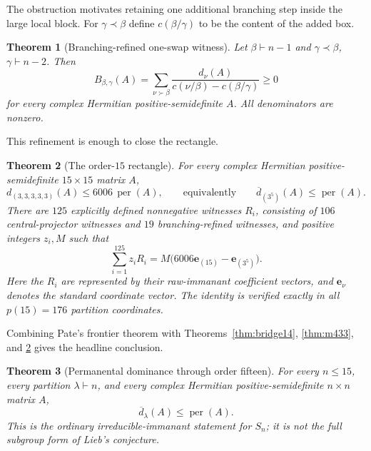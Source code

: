 \documentclass[11pt]{article}
\newtheorem{theorem}{Theorem}[section]
\theoremstyle{definition}
\newcommand{\per}{\operatorname{per}}
\newcommand{\dbar}{\overline d}
\newcommand{\youngcovers}{\succ}
\newcommand{\youngcovered}{\prec}
\begin{document}
The obstruction motivates retaining one additional branching step inside the large local block.  For $\gamma\youngcovered\beta$ define $c(\beta/\gamma)$ to be the content of the added box.

\begin{theorem}[Branching-refined one-swap witness]\label{thm:branching}
Let $\beta\vdash n-1$ and $\gamma\youngcovered\beta$, $\gamma\vdash n-2$.  Then
\begin{equation}\label{eq:branching}
 B_{\beta,\gamma}(A)=
 \sum_{\nu\youngcovers\beta}
 \frac{d_\nu(A)}{c(\nu/\beta)-c(\beta/\gamma)}\ge0
\end{equation}
for every complex Hermitian positive-semidefinite $A$.  All denominators are nonzero.
\end{theorem}

This refinement is enough to close the rectangle.

\begin{theorem}[The order-$15$ rectangle]\label{thm:rect15}
For every complex Hermitian positive-semidefinite $15\times15$ matrix $A$,
\[
 d_{(3,3,3,3,3)}(A)\le6006\,\per(A),
 \qquad\text{equivalently}\qquad
 \dbar_{(3^5)}(A)\le\per(A).
\]
There are $125$ explicitly defined nonnegative witnesses $R_i$, consisting of $106$ central-projector witnesses and $19$ branching-refined witnesses, and positive integers $z_i,M$ such that
\begin{equation}\label{eq:rectcert}
 \sum_{i=1}^{125}z_iR_i
 =M\bigl(6006\mathbf e_{(15)}-\mathbf e_{(3^5)}\bigr).
\end{equation}
Here the $R_i$ are represented by their raw-immanant coefficient vectors, and $\mathbf e_\nu$ denotes the standard coordinate vector.  The identity is verified exactly in all $p(15)=176$ partition coordinates.
\end{theorem}

Combining Pate's frontier theorem with Theorems~\ref{thm:bridge14}, \ref{thm:m433}, and \ref{thm:rect15} gives the headline conclusion.

\begin{theorem}[Permanental dominance through order fifteen]\label{thm:through15}
For every $n\le15$, every partition $\lambda\vdash n$, and every complex Hermitian positive-semidefinite $n\times n$ matrix $A$,
\[
 \dbar_\lambda(A)\le\per(A).
\]
This is the ordinary irreducible-immanant statement for $S_n$; it is not the full subgroup form of Lieb's conjecture.
\end{theorem}
\end{document}
